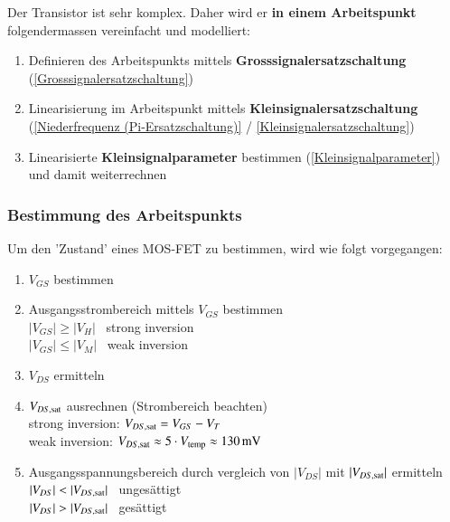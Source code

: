 Der Transistor ist sehr komplex.
Daher wird er \textbf{in einem Arbeitspunkt} folgendermassen vereinfacht  und modelliert:

\begin{enumerate}
    \item Definieren des Arbeitspunkts mittels \textbf{Grosssignalersatzschaltung} (\ref{Grosssignalersatzschaltung})
    \item Linearisierung im Arbeitspunkt mittels \textbf{Kleinsignalersatzschaltung} (\ref{Niederfrequenz (Pi-Ersatzschaltung)} / \ref{Kleinsignalersatzschaltung})
    \item Linearisierte \textbf{Kleinsignalparameter} bestimmen (\ref{Kleinsignalparameter}) und damit weiterrechnen
\end{enumerate}


\subsubsection{Bestimmung des Arbeitspunkts}
Um den 'Zustand' eines MOS-FET zu bestimmen, wird wie folgt vorgegangen:

\begin{minipage}[t]{0.44\columnwidth}
    \raggedright
    \begin{enumerate}
        \item $V_{GS}$ bestimmen 
        \item Ausgangsstrombereich mittels $V_{GS}$ bestimmen \\
            $|V_{GS}| \geq |V_H|$ \rightarrow\ strong inversion \\
            $|V_{GS}| \leq |V_M|$ \rightarrow\ weak inversion
        \item $V_{DS}$ ermitteln
    \end{enumerate}
\end{minipage}
\hfill
\begin{minipage}[t]{0.54\columnwidth}
    \raggedright
    \begin{enumerate}
        \setcounter{enumi}{3}
        \item $V_{DS, \rm sat}$ ausrechnen (Strombereich beachten)  \\
            strong inversion: $V_{DS, \rm sat} = V_{GS} - V_T$  \\
            weak inversion: $V_{DS, \rm sat} \approx 5 \cdot V_{\rm temp} \approx \qty{130}{\milli \volt}$ 
        \item Ausgangsspannungsbereich durch vergleich von $|V_{DS}|$ mit $|V_{DS, \rm sat}|$ ermitteln  \\
            $|V_{DS}| < |V_{DS, \rm sat}|$ \rightarrow\ ungesättigt \\
            $|V_{DS}| > |V_{DS, \rm sat}|$ \rightarrow\ gesättigt
    \end{enumerate}
\end{minipage}


